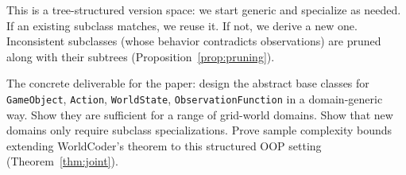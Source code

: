 \documentclass{article}
\begin{document}
This is a tree-structured version space: we start generic and specialize
as needed.  If an existing subclass matches, we reuse it.  If not, we
derive a new one.  Inconsistent subclasses (whose behavior contradicts
observations) are pruned along with their subtrees
(Proposition~\ref{prop:pruning}).

The concrete deliverable for the paper: design the abstract base classes
for \texttt{GameObject}, \texttt{Action}, \texttt{WorldState},
\texttt{ObservationFunction} in a domain-generic way.  Show they are
sufficient for a range of grid-world domains.  Show that new domains only
require subclass specializations.  Prove sample complexity bounds extending
WorldCoder's theorem to this structured OOP setting
(Theorem~\ref{thm:joint}).
\end{document}

